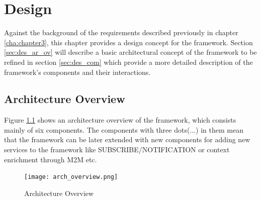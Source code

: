 \chapter{Design\label{cha:chapter4}}
Against the background of the requirements described previously in chapter \ref{cha:chapter3}, this chapter provides a design concept for the framework. Section \ref{sec:des_ar_ov} will describe a basic architectural concept of the framework to be refined in section \ref{sec:des_com} which provide a more detailed description of the framework's components and their interactions. 
        


\section{Architecture Overview\label{sec:des_ar_ov}}
Figure \ref{fig:arch_overview} shows an architecture overview of the framework, which consists mainly of six components. The components with three dots(...) in them mean that the framework can be later extended with new components for adding new services to the framework like SUBSCRIBE/NOTIFICATION or context enrichment through \ac{M2M} etc.

\begin{figure}[htb]
  \centering
  \texttt{[image: arch\_overview.png]}\\
  \caption{Architecture Overview}
  \label{fig:arch_overview}
\end{figure}

%
%

